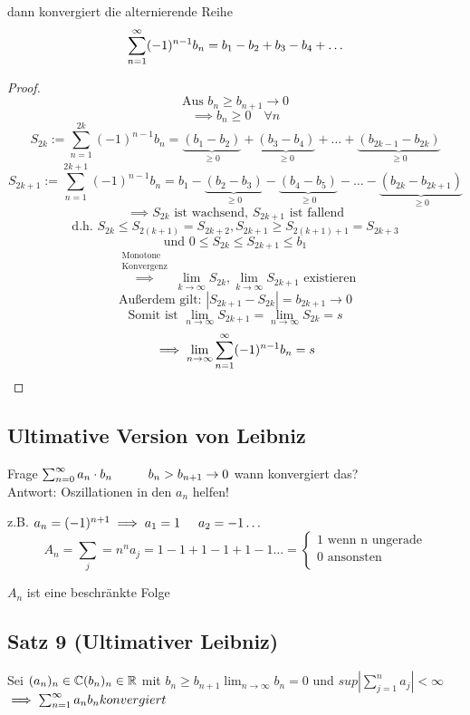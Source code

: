 dann konvergiert die alternierende Reihe
\[\sum_{n=1}^{\infty} (-1)^{n-1} b_n = b_1-b_2+b_3-b_4+\ldots \]

\begin{proof}
 \[\text{Aus } b_n \geq b_{n+1} \to 0\]
 \[\implies b_n \geq 0 \quad \forall n\]
 \[S_{2k}:=\sum_{n=1}^{2k} (-1)^{n-1} b_n = \underbrace{(b_1-b_2)}_{\geq 0}+\underbrace{(b_3-b_4)}_{\geq 0}+\ldots+\underbrace{(b_{2k-1}-b_{2k})}_{\geq 0}\]
 \[S_{2k+1}:=\sum_{n=1}^{2k+1} (-1)^{n-1} b_n = b_1 - \underbrace{(b_2-b_3)}_{\geq 0}-\underbrace{(b_4-b_5)}_{\geq 0}-\ldots-\underbrace{(b_{2k}-b_{2k+1})}_{\geq 0}\]
 \[\implies S_{2k} \text{ ist wachsend, } S_{2k+1} \text{ ist fallend}\]
 \[\text{d.h. } S_{2k} \leq S_{2(k+1)} = S_{2k+2}, S_{2k+1} \geq S_{2(k+1)+1} = S_{2k+3}\]
 \[\text{und } 0\leq S_{2k} \leq S_{2k+1} \leq b_1\]
 \[\stackrel{\begin{array}{l}\text{Monotone}\\\text{Konvergenz}\end{array}}{\implies} \lim_{k \to \infty} S_{2k}, \lim_{k \to \infty} S_{2k+1} \text{ existieren} \]
 \[\text{Außerdem gilt: } |S_{2k+1}-S_{2k}|=b_{2k+1} \to 0\]
 \[\text{Somit ist } \lim_{n\to \infty} S_{2k+1} = \lim_{n\to \infty} S_{2k} = s\]
 \[\implies \lim_{n \to \infty} \sum_{n=1}^{\infty} (-1)^{n-1} b_n=s\] 
\end{proof}

\subsection{Ultimative Version von Leibniz}
Frage $\sum_{n=0}^{\infty} a_n \cdot b_n \hspace{10mm} b_n > b_{n+1} \to 0$ wann konvergiert das? \\
Antwort: Oszillationen in den $a_n$ helfen!

z.B. $a_n = (-1)^{n+1} \implies a_1 = 1 \hspace{5mm} a_2 = -1 \ldots $
$$A_n = \sum_j=n^{n} a_j = 1-1+1-1+1-1 \ldots =  
\begin{cases}
\text{1 wenn n ungerade}	\\
\text{0 ansonsten }		\\
\end{cases}
$$

$A_n$ ist eine beschränkte Folge

\subsection{Satz 9 (Ultimativer Leibniz)}
Sei $(a_n)_n \in \mathbb{C} (b_n)_n \in \mathbb{R}$ mit $b_n \geq b_{n+1} \lim_{n \to \infty} b_{n} = 0 $ und $sup | \sum_{j=1}^{n} a_j| < \infty$
$\implies  \sum_{n=1}^{\infty} a_n b_n konvergiert$


